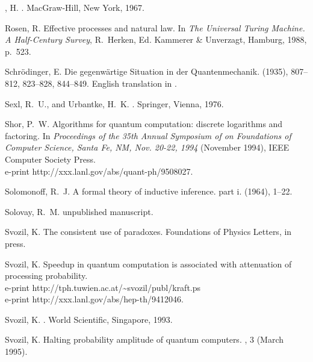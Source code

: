 \begin{thebibliography}{100}
{, H.}
.
\newblock MacGraw-Hill, New York, 1967.

{\sc Rosen, R.}
\newblock Effective processes and natural law.
\newblock In {\em The Universal Turing Machine. A Half-Century Survey},
  R.~Herken, Ed. Kammerer \& Unverzagt, Hamburg, 1988, p.~523.

{\sc Schr{\"{o}}dinger, E.}
\newblock Die gegenw{\"{a}}rtige {S}ituation in der {Q}uantenmechanik.
 (1935), 807--812, 823--828, 844--849.
\newblock English translation in \cite[pp. 152-167]{wheeler-Zurek:83}.

{\sc Sexl, R.~U., and Urbantke, H.~K.}
.
\newblock Springer, Vienna, 1976.

{\sc Shor, P.~W.}
\newblock Algorithms for quantum computation: discrete logarithms and
  factoring.
\newblock In {\em Proceedings of the 35th Annual Symposium of on Foundations of
  Computer Science, Santa Fe, NM, Nov. 20-22, 1994\/} (November 1994), IEEE
  Computer Society Press.
\newblock \\e-print http://xxx.lanl.gov/abs/quant-ph/9508027.

{\sc Solomonoff, R.~J.}
\newblock A formal theory of inductive inference. part i.
 (1964), 1--22.

{\sc Solovay, R.~M.}
\newblock unpublished manuscript.

{\sc Svozil, K.}
\newblock The consistent use of paradoxes.
\newblock Foundations of Physics Letters, in press.

{\sc Svozil, K.}
\newblock Speedup in quantum computation is associated with attenuation of
  processing probability.
\newblock \\e-print {http://tph.tuwien.ac.at/\~{}svozil/publ/kraft.ps} \\
 e-print http://xxx.lanl.gov/abs/hep-th/9412046.

{\sc Svozil, K.}
.
\newblock World Scientific, Singapore, 1993.

{\sc Svozil, K.}
\newblock Halting probability amplitude of quantum computers.
, 3 (March 1995).


\end{thebibliography}
